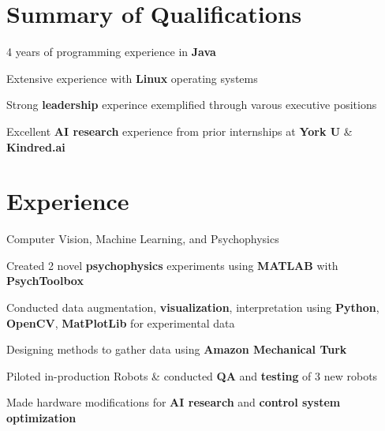 \documentclass[]{chandan-cv}
\begin{document}
\begin{minipage}[t]{0.66\textwidth} 


\section{Summary of Qualifications}
\runsubsection{ }
\descript{ }
\location{ }
\vspace{\topsep} %
\begin{tightemize}
	\item 4 years of programming experience in \textbf{Java}
	\item Extensive experience with \textbf{Linux} operating systems
	\item Strong \textbf{leadership} experince exemplified through varous executive positions
	\item Excellent \textbf{AI research} experience from prior internships at \textbf{York U} \& \textbf{Kindred.ai} 
\end{tightemize}
\sectionsep


\section{Experience}
\begin{tightemize}
	\item Computer Vision, Machine Learning, and Psychophysics
	\item Created 2 novel \textbf{psychophysics} experiments using \textbf{MATLAB} with \textbf{PsychToolbox}
	\item Conducted data augmentation, \textbf{visualization}, interpretation using \textbf{Python}, \textbf{OpenCV}, \textbf{MatPlotLib} for experimental data
	\item Designing methods to gather data using \textbf{Amazon Mechanical Turk}
\end{tightemize}
\sectionsep

\begin{tightemize}
	\item Piloted in-production Robots \& conducted \textbf{QA} and \textbf{testing} of 3 new robots
	\item Made hardware modifications for \textbf{AI research} and \textbf{control system optimization}
\end{tightemize}
\sectionsep


\end{minipage}
\end{document}
